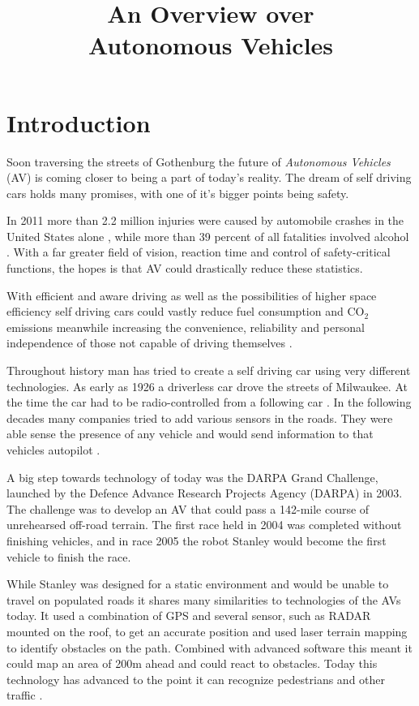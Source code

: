\documentclass[11pt]{article}
\title{An Overview over \\ Autonomous Vehicles}
\date{}
\newcommand{\TODO}[1]{\todo[inline]{{\footnotesize #1}}}
\begin{document}
\maketitle
\begin{abstract}
\TODO{Abstract}
\end{abstract}

\section{Introduction}
Soon traversing the streets of Gothenburg the future of \textit{Autonomous Vehicles} (AV) is coming closer to being a part of today's reality. The dream of self driving cars holds many promises, with one of it's bigger points being safety.

In 2011 more than 2.2 million injuries were caused by automobile crashes in the United States alone \cite[p. 14]{Anderson2014rand}, while more than 39 percent of all fatalities involved alcohol \cite[p. 16]{Anderson2014rand}. With a far greater field of vision, reaction time and control of safety-critical functions, the hopes is that AV could drastically reduce these statistics.

With efficient and aware driving as well as the possibilities of higher space efficiency self driving cars could vastly reduce fuel consumption and CO$_2$ emissions \cite[p. 28ff]{Anderson2014rand} meanwhile increasing the convenience, reliability and personal independence of those not capable of driving themselves \cite[p. 17]{Anderson2014rand}.

Throughout history man has tried to create a self driving car using very different technologies. As early as 1926 a driverless car drove the streets of Milwaukee. At the time the car had to be radio-controlled from a following car \cite{Sentinel1926Phantom}. In the following decades many companies tried to add various sensors in the roads. They were able sense the presence of any vehicle and would send information to that vehicles autopilot \cite{Courier1960Driverless}.

A big step towards technology of today was the DARPA Grand Challenge, launched by the Defence Advance Research Projects Agency (DARPA) in 2003. The challenge was to develop an AV that could pass a 142-mile course of unrehearsed off-road terrain. The first race held in 2004 was completed without finishing vehicles, and in race 2005 the robot Stanley would become the first vehicle to finish the race.

While Stanley was designed for a static environment and would be unable to travel on populated roads it shares many similarities to technologies of the AVs today. It used a combination of GPS and several sensor, such as RADAR mounted on the roof, to get an accurate position and used laser terrain mapping to identify obstacles on the path. Combined with advanced software this meant it could map an area of 200m ahead and could react to obstacles. Today this technology has advanced to the point it can recognize pedestrians and other traffic \cite{Thrun2006stanley}.
\end{document}

